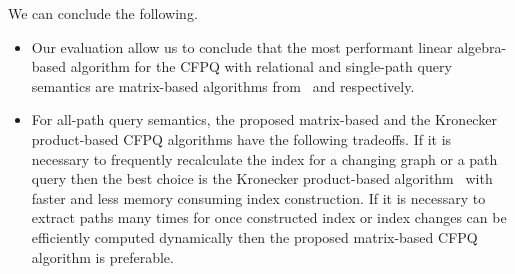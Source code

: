 We can conclude the following.
\begin{itemize}
	\item Our evaluation allow us to conclude that the most performant linear algebra-based algorithm for the CFPQ with relational and single-path query semantics are matrix-based algorithms from~\cite{Azimov:2018:CPQ:3210259.3210264} and \cite{10.1145/3398682.3399163} respectively.
	\item For all-path query semantics, the proposed matrix-based and the Kronecker product-based CFPQ algorithms have the following tradeoffs. If it is necessary to frequently recalculate the index for a changing graph or a path query then the best choice is the Kronecker product-based algorithm~\cite{kron} with faster and less memory consuming index construction. If it is necessary to extract paths many times for once constructed index or index changes can be efficiently computed dynamically then the proposed matrix-based CFPQ algorithm is preferable.
\end{itemize}



